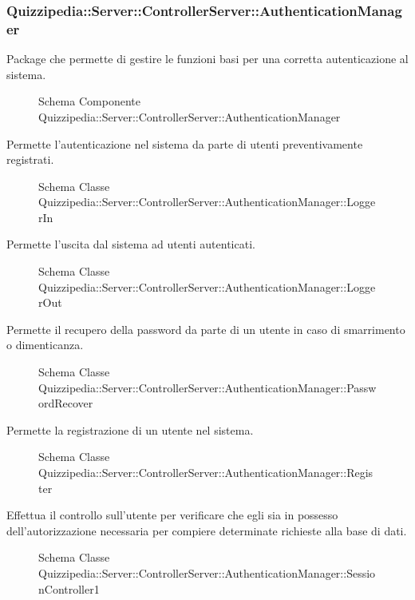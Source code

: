 \subsubsection{Quizzipedia::Server::ControllerServer::AuthenticationManager}
Package che permette di gestire le funzioni basi per una corretta autenticazione al sistema.
\begin{figure}[H]
\centering
\noindent{}
\caption{Schema Componente Quizzipedia::Server::ControllerServer::AuthenticationManager}
\end{figure}
Permette l'autenticazione nel sistema da parte di utenti preventivamente registrati.
\begin{figure}[H]
\centering
\noindent{}
\caption{Schema Classe Quizzipedia::Server::ControllerServer::AuthenticationManager::LoggerIn}
\end{figure}
Permette l'uscita dal sistema ad utenti autenticati.
\begin{figure}[H]
\centering
\noindent{}
\caption{Schema Classe Quizzipedia::Server::ControllerServer::AuthenticationManager::LoggerOut}
\end{figure}
Permette il recupero della password da parte di un utente in caso di smarrimento o dimenticanza.
\begin{figure}[H]
\centering
\noindent{}
\caption{Schema Classe Quizzipedia::Server::ControllerServer::AuthenticationManager::PasswordRecover}
\end{figure}
Permette la registrazione di un utente nel sistema.
\begin{figure}[H]
\centering
\noindent{}
\caption{Schema Classe Quizzipedia::Server::ControllerServer::AuthenticationManager::Register}
\end{figure}
Effettua il controllo sull'utente per verificare che egli sia in possesso dell'autorizzazione necessaria per compiere determinate richieste alla base di dati.
\begin{figure}[H]
\centering
\noindent{}
\caption{Schema Classe Quizzipedia::Server::ControllerServer::AuthenticationManager::SessionController1}
\end{figure}
